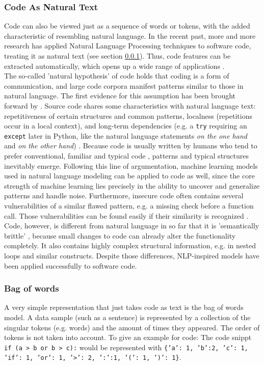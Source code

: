 \documentclass[
	a4paper,
	pagesize,
	pdftex,
	12pt,
	twoside, %
	BCOR=5mm, %
	ngerman,
	fleqn,
	final,
	]{scrartcl}
\begin{document}
\subsubsection{Code As Natural Text}\label{Natural-Hypothesis}\label{Semantically-Brittle}
Code can also be viewed just as a sequence of words or tokens, with the added characteristic of resembling natural language. In the recent past, more and more research has applied Natural Language Processing techniques to software code, treating it as natural text (see section \ref{Natural-Hypothesis}). Thus, code features can be extracted automatically, which opens up a wide range of applications \cite{Dam.2017}.\\
The so-called 'natural hypothesis' of code holds that coding is a form of communication, and large code corpora manifest patterns similar to those in natural language. The first evidence for this assumption has been brought forward by \cite{Hindle.2012}.
Source code shares some characteristics with natural language text: repetitiveness of certain structures and common patterns, localness (repetitions occur in a local context), and long-term dependencies (e.g. a \texttt{try} requiring an \texttt{except} later in Python, like the natural language statements \textit{on the one hand} and \textit{on the other hand}) \cite{Dam.2016}.
Because code is usually written by humans who tend to prefer conventional, familiar and typical code \cite{Allamanis.2018}, patterns and typical structures inevitably emerge. Following this line of argumentation, machine learning models used in natural language modeling can be applied to code as well, since the core strength of machine learning lies precisely in the ability to uncover and generalize patterns and handle noise. Furthermore, insecure code often contains several vulnerabilities of a similar flawed pattern, e.g. a missing check before a function call. Those vulnerabilities can be found easily if their similarity is recognized \cite{Yamaguchi.2012}. 
Code, however, is different from natural language in so far that it is 'semantically brittle' \cite{Allamanis.2018}, because small changes to code can already alter the functionality completely. It also contains highly complex structural information, e.g. in nested loops and similar constructs. Despite those differences, NLP-inspired models have been applied successfully to software code.

\subsubsection{Bag of words}\label{bag-of-words}
A very simple representation that just takes code as text is the bag of words model. A data sample (such as a sentence) is represented by a collection of the singular tokens (e.g. words) and the amount of times they appeared. The order of tokens is not taken into account. To give an example for code: The code snippt \texttt{if (a > b or b > c):} would be represented with \texttt{\{'a': 1, 'b':2, 'c': 1, 'if': 1, 'or': 1, '>': 2, ':':1, '(': 1, ')': 1\}}.
\end{document}
